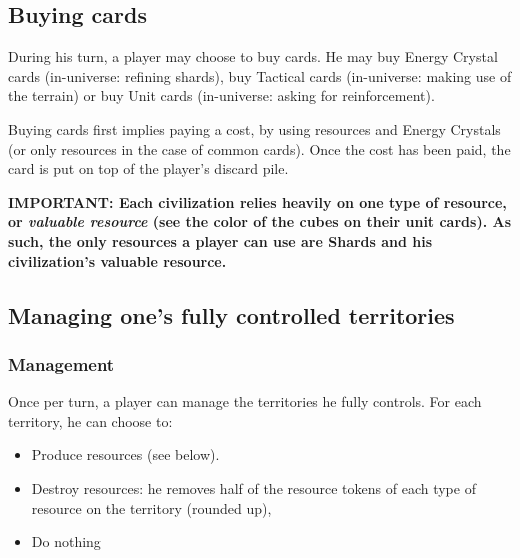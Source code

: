 \documentclass[a4paper]{article}
\begin{document}
  
  \subsection{Buying cards}

    During his turn, a player may choose to buy cards.
    He may buy Energy Crystal cards (in-universe: refining shards),
    buy Tactical cards (in-universe: making use of the terrain)
    or buy Unit cards (in-universe: asking for reinforcement).
    
    Buying cards first implies paying a cost, by using resources and Energy Crystals
    (or only resources in the case of common cards).
    Once the cost has been paid, the card is put on top of the player's discard pile.
    
    \hspace{-2em} \textbf{IMPORTANT:
    Each civilization relies heavily on one type of resource, or
    \textit{valuable resource} (see the color of the cubes on their unit cards).
    As such, the only resources a player can use are Shards and his civilization's
    valuable resource.
    }


\newpage
  \subsection{Managing one's fully controlled territories}
    \subsubsection{Management}
    \vspace{-1em}
    Once per turn, a player can manage the territories he fully controls.
    For each territory, he can choose to:
    \vspace{-1.3em}
    \begin{itemize}
        \item Produce resources (see below).
        \item Destroy resources: he removes half of the resource
        tokens of each type of resource on the territory (rounded up),
        \item Do nothing
    \end{itemize}
  
\end{document}
